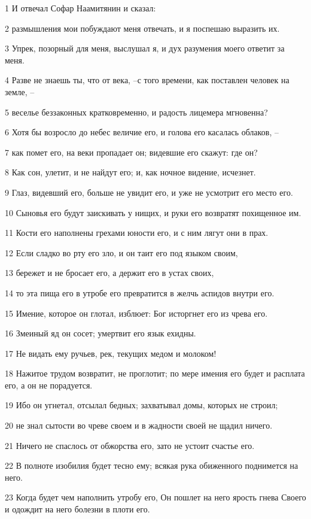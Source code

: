 \par 1 И отвечал Софар Наамитянин и сказал:
\par 2 размышления мои побуждают меня отвечать, и я поспешаю выразить их.
\par 3 Упрек, позорный для меня, выслушал я, и дух разумения моего ответит за меня.
\par 4 Разве не знаешь ты, что от века, --с того времени, как поставлен человек на земле, --
\par 5 веселье беззаконных кратковременно, и радость лицемера мгновенна?
\par 6 Хотя бы возросло до небес величие его, и голова его касалась облаков, --
\par 7 как помет его, на веки пропадает он; видевшие его скажут: где он?
\par 8 Как сон, улетит, и не найдут его; и, как ночное видение, исчезнет.
\par 9 Глаз, видевший его, больше не увидит его, и уже не усмотрит его место его.
\par 10 Сыновья его будут заискивать у нищих, и руки его возвратят похищенное им.
\par 11 Кости его наполнены грехами юности его, и с ним лягут они в прах.
\par 12 Если сладко во рту его зло, и он таит его под языком своим,
\par 13 бережет и не бросает его, а держит его в устах своих,
\par 14 то эта пища его в утробе его превратится в желчь аспидов внутри его.
\par 15 Имение, которое он глотал, изблюет: Бог исторгнет его из чрева его.
\par 16 Змеиный яд он сосет; умертвит его язык ехидны.
\par 17 Не видать ему ручьев, рек, текущих медом и молоком!
\par 18 Нажитое трудом возвратит, не проглотит; по мере имения его будет и расплата его, а он не порадуется.
\par 19 Ибо он угнетал, отсылал бедных; захватывал домы, которых не строил;
\par 20 не знал сытости во чреве своем и в жадности своей не щадил ничего.
\par 21 Ничего не спаслось от обжорства его, зато не устоит счастье его.
\par 22 В полноте изобилия будет тесно ему; всякая рука обиженного поднимется на него.
\par 23 Когда будет чем наполнить утробу его, Он пошлет на него ярость гнева Своего и одождит на него болезни в плоти его.
